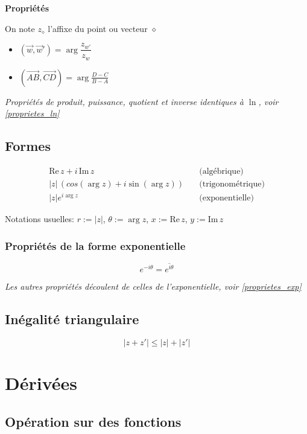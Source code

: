\documentclass{article}
\newcommand{\im}{\text{Im}\,}
\newcommand{\re}{\text{Re}\,}
\newcommand{\conj}[1]{\overline{#1}}
\newcommand{\placeholder}{\diamond}
\newcommand{\vect}[1]{\overrightarrow{#1}}
\begin{document}
\textbf{Propriétés}

On note $z_\placeholder$ l'affixe du point ou vecteur $\placeholder$

\begin{itemize}
    \item $(\vec w, \vect w') = \arg{\dfrac{z_{w'}}{z_w}}$
    \item $(\vect{AB}, \vect{CD}) = \arg{\frac{D-C}{B-A}}$
\end{itemize}

\textit{Propriétés de produit, puissance, quotient et inverse identiques à $\ln$, voir \ref{proprietes_ln}}


\subsection{Formes}

\begin{equation*}
    \begin{split}
        \re z + i\,\im z&\quad\text{(algébrique)} \\
          |z|\,(cos(\arg z) + i \sin(\arg z) )&\quad\text{(trigonométrique)} \\
          |z|e^{i\arg z}&\quad\text{(exponentielle)}
    \end{split}
\end{equation*}

Notations usuelles: $r := |z|$, $\theta := \arg z$, $x := \re z$, $y := \im z$

\subsubsection{Propriétés de la forme exponentielle}

\[e^{-i\theta} = \conj{e^{i\theta}}\]

\textit{Les autres propriétés découlent de celles de l'exponentielle, voir \ref{proprietes_exp}}

\subsection{Inégalité triangulaire}

\[| z + z' | \leq |z| + |z'|\]

\newpage\section{Dérivées}

\subsection{Opération sur des fonctions}
\end{document}
